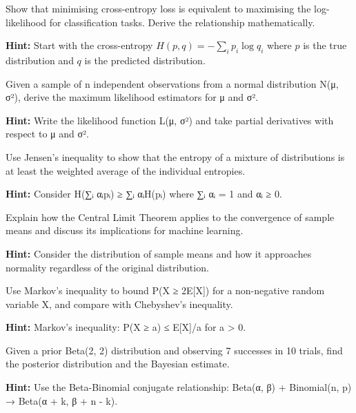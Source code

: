 \begin{problem}
Show that minimising cross-entropy loss is equivalent to maximising the log-likelihood for classification tasks. Derive the relationship mathematically.

\textbf{Hint:} Start with the cross-entropy $H(p,q) = -\sum_i p_i \log q_i$ where $p$ is the true distribution and $q$ is the predicted distribution.
\end{problem}

\begin{problem}
Given a sample of n independent observations from a normal distribution N(μ, σ²), derive the maximum likelihood estimators for μ and σ².

\textbf{Hint:} Write the likelihood function L(μ, σ²) and take partial derivatives with respect to μ and σ².
\end{problem}

\begin{problem}
Use Jensen's inequality to show that the entropy of a mixture of distributions is at least the weighted average of the individual entropies.

\textbf{Hint:} Consider H(∑ᵢ αᵢpᵢ) ≥ ∑ᵢ αᵢH(pᵢ) where ∑ᵢ αᵢ = 1 and αᵢ ≥ 0.
\end{problem}

\begin{problem}
Explain how the Central Limit Theorem applies to the convergence of sample means and discuss its implications for machine learning.

\textbf{Hint:} Consider the distribution of sample means and how it approaches normality regardless of the original distribution.
\end{problem}

\begin{problem}
Use Markov's inequality to bound P(X ≥ 2E[X]) for a non-negative random variable X, and compare with Chebyshev's inequality.

\textbf{Hint:} Markov's inequality: P(X ≥ a) ≤ E[X]/a for a > 0.
\end{problem}

\begin{problem}
Given a prior Beta(2, 2) distribution and observing 7 successes in 10 trials, find the posterior distribution and the Bayesian estimate.

\textbf{Hint:} Use the Beta-Binomial conjugate relationship: Beta(α, β) + Binomial(n, p) → Beta(α + k, β + n - k).
\end{problem}

